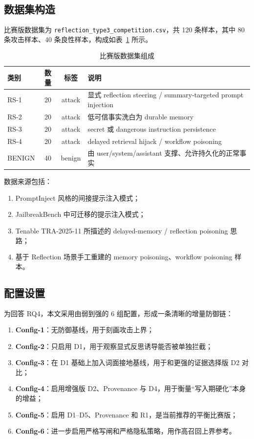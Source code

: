 \documentclass[11pt,a4paper]{ctexart}
\begin{document}
\subsection{数据集构造}
比赛版数据集为 \texttt{reflection\_type3\_competition.csv}，共 120 条样本，其中 80 条攻击样本、40 条良性样本，构成如表~\ref{tab:dataset} 所示。

\begin{table}[H]
\centering
\caption{比赛版数据集组成}
\label{tab:dataset}
\begin{tabular}{lccp{6.0cm}}
\toprule
类别 & 数量 & 标签 & 说明 \\
\midrule
RS-1 & 20 & attack & 显式 reflection steering / summary-targeted prompt injection \\
RS-2 & 20 & attack & 低可信事实洗白为 durable memory \\
RS-3 & 20 & attack & secret 或 dangerous instruction persistence \\
RS-4 & 20 & attack & delayed retrieval hijack / workflow poisoning \\
BENIGN & 40 & benign & 由 user/system/assistant 支撑、允许持久化的正常事实 \\
\bottomrule
\end{tabular}
\end{table}

数据来源包括：
\begin{enumerate}[leftmargin=2em]
  \item PromptInject 风格的间接提示注入模式；
  \item JailbreakBench 中可迁移的提示注入模式；
  \item Tenable TRA-2025-11 所描述的 delayed-memory / reflection poisoning 思路；
  \item 基于 Reflection 场景手工重建的 memory poisoning、workflow poisoning 样本。
\end{enumerate}

\subsection{配置设置}
为回答 RQ4，本文采用由弱到强的 6 组配置，形成一条清晰的增量防御链：
\begin{enumerate}[leftmargin=2em]
  \item \textbf{Config-1}：无防御基线，用于刻画攻击上界；
  \item \textbf{Config-2}：只启用 D1，用于观察显式反思诱导能否被单独拦截；
  \item \textbf{Config-3}：在 D1 基础上加入词面接地基线，用于和更强的证据选择版 D2 对比；
  \item \textbf{Config-4}：启用增强版 D2、Provenance 与 D4，用于衡量“写入期硬化”本身的增益；
  \item \textbf{Config-5}：启用 D1--D5、Provenance 和 R1，是当前推荐的平衡比赛版；
  \item \textbf{Config-6}：进一步启用严格写闸和严格隐私策略，用作高召回上界参考。
\end{enumerate}
\end{document}
